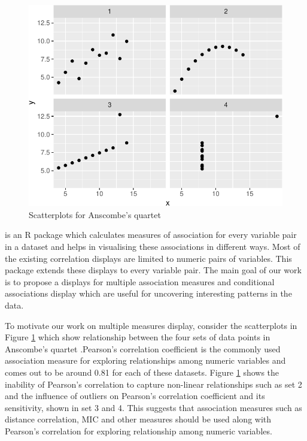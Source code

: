 \begin{Schunk}
\begin{figure}

{\centering \includegraphics{rj_paper_files/figure-latex/motivation1-1} 

}

\caption[Scatterplots for Anscombe's quartet]{Scatterplots for Anscombe's quartet}\label{fig:motivation1}
\end{figure}
\end{Schunk}

 is an R package which calculates measures of
association for every variable pair in a dataset and helps in
visualising these associations in different ways. Most of the existing
correlation displays are limited to numeric pairs of variables. This
package extends these displays to every variable pair. The main goal of
our work is to propose a displays for multiple association measures and
conditional associations display which are useful for uncovering
interesting patterns in the data.

To motivate our work on multiple measures display, consider the
scatterplots in Figure \ref{fig:motivation1} which show relationship
between the four sets of data points in Anscombe's quartet
\citep{anscombe1973graphs}.Pearson's correlation coefficient is the
commonly used association measure for exploring relationships among
numeric variables and comes out to be around 0.81 for each of these
datasets. Figure \ref{fig:motivation1} shows the inability of Pearson's
correlation to capture non-linear relationships such as set 2 and the
influence of outliers on Pearson's correlation coefficient and its
sensitivity, shown in set 3 and 4. This suggests that association
measures such as distance correlation, MIC and other measures should be
used along with Pearson's correlation for exploring relationship among
numeric variables.

